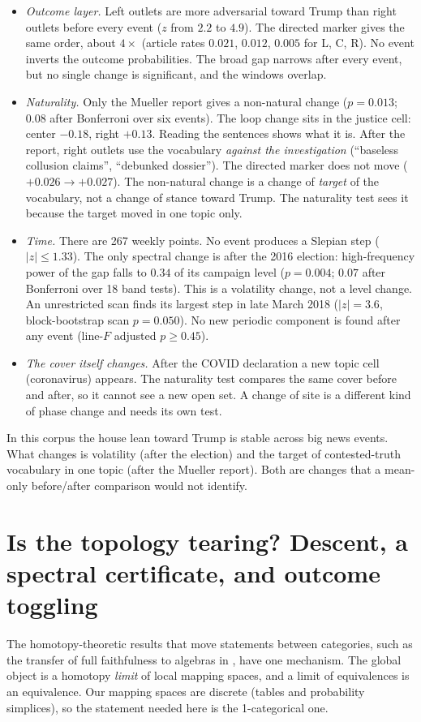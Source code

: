 \documentclass[11pt]{article}
\theoremstyle{definition}
\theoremstyle{remark}
\begin{document}
\begin{itemize}
  \item \emph{Outcome layer.} Left outlets are more adversarial toward Trump than right outlets before every event ($z$ from $2.2$ to $4.9$). The directed marker gives the same order, about $4\times$ (article rates $0.021$, $0.012$, $0.005$ for L, C, R). No event inverts the outcome probabilities. The broad gap narrows after every event, but no single change is significant, and the windows overlap.
  \item \emph{Naturality.} Only the Mueller report gives a non-natural change ($p=0.013$; $0.08$ after Bonferroni over six events). The loop change sits in the justice cell: center $-0.18$, right $+0.13$. Reading the sentences shows what it is. After the report, right outlets use the vocabulary \emph{against the investigation} (``baseless collusion claims'', ``debunked dossier''). The directed marker does not move ($+0.026\to+0.027$). The non-natural change is a change of \emph{target} of the vocabulary, not a change of stance toward Trump. The naturality test sees it because the target moved in one topic only.
  \item \emph{Time.} There are 267 weekly points. No event produces a Slepian step ($|z|\le1.33$). The only spectral change is after the 2016 election: high-frequency power of the gap falls to $0.34$ of its campaign level ($p=0.004$; $0.07$ after Bonferroni over 18 band tests). This is a volatility change, not a level change. An unrestricted scan finds its largest step in late March 2018 ($|z|=3.6$, block-bootstrap scan $p=0.050$). No new periodic component is found after any event (line-$F$ adjusted $p\ge0.45$).
  \item \emph{The cover itself changes.} After the COVID declaration a new topic cell (coronavirus) appears. The naturality test compares the same cover before and after, so it cannot see a new open set. A change of site is a different kind of phase change and needs its own test.
\end{itemize}
In this corpus the house lean toward Trump is stable across big news events. What changes is volatility (after the election) and the target of contested-truth vocabulary in one topic (after the Mueller report). Both are changes that a mean-only before/after comparison would not identify.

\section{Is the topology tearing? Descent, a spectral certificate, and outcome toggling}\label{sec:certificate}
The homotopy-theoretic results that move statements between categories, such as the transfer of full faithfulness to algebras in \cite[Prop.~15.2.3.1]{lurieSAG}, have one mechanism. The global object is a homotopy \emph{limit} of local mapping spaces, and a limit of equivalences is an equivalence. Our mapping spaces are discrete (tables and probability simplices), so the statement needed here is the 1-categorical one.
\end{document}
